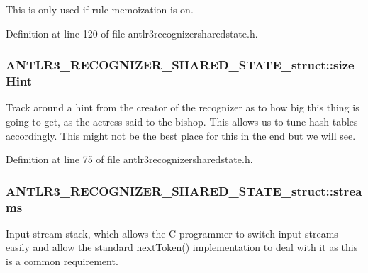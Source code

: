 This is only used if rule memoization is on. 

Definition at line 120 of file antlr3recognizersharedstate.\-h.

\hypertarget{struct_a_n_t_l_r3___r_e_c_o_g_n_i_z_e_r___s_h_a_r_e_d___s_t_a_t_e__struct_ac890be424a1c4257e68317d481ca7fcd}{
\subsubsection[{size\-Hint}]{ A\-N\-T\-L\-R3\-\_\-\-R\-E\-C\-O\-G\-N\-I\-Z\-E\-R\-\_\-\-S\-H\-A\-R\-E\-D\-\_\-\-S\-T\-A\-T\-E\-\_\-struct\-::size\-Hint}}\label{struct_a_n_t_l_r3___r_e_c_o_g_n_i_z_e_r___s_h_a_r_e_d___s_t_a_t_e__struct_ac890be424a1c4257e68317d481ca7fcd}
Track around a hint from the creator of the recognizer as to how big this thing is going to get, as the actress said to the bishop. This allows us to tune hash tables accordingly. This might not be the best place for this in the end but we will see. 

Definition at line 75 of file antlr3recognizersharedstate.\-h.

\hypertarget{struct_a_n_t_l_r3___r_e_c_o_g_n_i_z_e_r___s_h_a_r_e_d___s_t_a_t_e__struct_a6215cb5ce99e66b0e4188883bd8d2d33}{
\subsubsection[{streams}]{ A\-N\-T\-L\-R3\-\_\-\-R\-E\-C\-O\-G\-N\-I\-Z\-E\-R\-\_\-\-S\-H\-A\-R\-E\-D\-\_\-\-S\-T\-A\-T\-E\-\_\-struct\-::streams}}\label{struct_a_n_t_l_r3___r_e_c_o_g_n_i_z_e_r___s_h_a_r_e_d___s_t_a_t_e__struct_a6215cb5ce99e66b0e4188883bd8d2d33}
Input stream stack, which allows the C programmer to switch input streams easily and allow the standard next\-Token() implementation to deal with it as this is a common requirement. 

